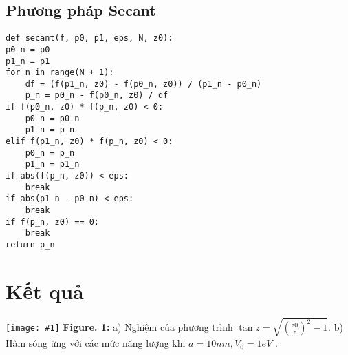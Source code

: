 \documentclass{article}
\newcommand{\image}[2]{
	\begin{center}
		\texttt{[image: \#1]}
		\textbf{Figure. 1:} #2
		\label{fig:#1}
	\end{center}
}
\begin{document}
	\subsection{Phương pháp Secant}
	\begin{verbatim}
def secant(f, p0, p1, eps, N, z0):
p0_n = p0
p1_n = p1
for n in range(N + 1):
	df = (f(p1_n, z0) - f(p0_n, z0)) / (p1_n - p0_n)
	p_n = p0_n - f(p0_n, z0) / df
if f(p0_n, z0) * f(p_n, z0) < 0:
	p0_n = p0_n
	p1_n = p_n
elif f(p1_n, z0) * f(p_n, z0) < 0:
	p0_n = p_n
	p1_n = p1_n
if abs(f(p_n, z0)) < eps:
	break
if abs(p1_n - p0_n) < eps:
	break
if f(p_n, z0) == 0:
	break
return p_n
	\end{verbatim}
	\section{Kết quả}
	\image{Final.pdf}{a) Nghiệm của phương trình $\tan z = \sqrt{\left( \frac{z0}{z} \right)^2 - 1}$. b) Hàm sóng ứng với các mức năng lượng khi $a = 10nm, V_0 = 1eV$ .}
	

	
\end{document}
